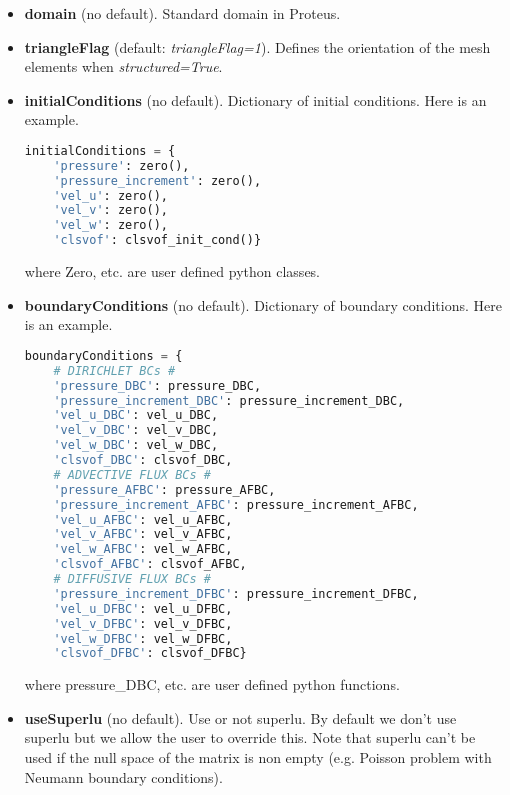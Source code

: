 \documentclass[english,11pt]{article}
\begin{document}
\begin{itemize}
\item {\bf domain} (no default).
  Standard domain in Proteus.

\item {\bf triangleFlag} (default: {\it triangleFlag=1}).
  Defines the orientation of the mesh elements when {\it structured=True}.

\item {\bf initialConditions} (no default).
  Dictionary of initial conditions. Here is an example.

\begin{lstlisting}[language=python, frame=single]
  initialConditions = {
    'pressure': zero(),
    'pressure_increment': zero(),
    'vel_u': zero(),
    'vel_v': zero(),
    'vel_w': zero(),
    'clsvof': clsvof_init_cond()}
\end{lstlisting}  
where Zero, etc. are user defined python classes.

\item {\bf boundaryConditions} (no default).
  Dictionary of boundary conditions. Here is an example.
  
\begin{lstlisting}[language=python, frame=single]
  boundaryConditions = {
    # DIRICHLET BCs #
    'pressure_DBC': pressure_DBC,
    'pressure_increment_DBC': pressure_increment_DBC,
    'vel_u_DBC': vel_u_DBC,
    'vel_v_DBC': vel_v_DBC,
    'vel_w_DBC': vel_w_DBC,
    'clsvof_DBC': clsvof_DBC,
    # ADVECTIVE FLUX BCs #
    'pressure_AFBC': pressure_AFBC,
    'pressure_increment_AFBC': pressure_increment_AFBC,
    'vel_u_AFBC': vel_u_AFBC,
    'vel_v_AFBC': vel_v_AFBC,
    'vel_w_AFBC': vel_w_AFBC,
    'clsvof_AFBC': clsvof_AFBC,
    # DIFFUSIVE FLUX BCs #
    'pressure_increment_DFBC': pressure_increment_DFBC,
    'vel_u_DFBC': vel_u_DFBC,
    'vel_v_DFBC': vel_v_DFBC,
    'vel_w_DFBC': vel_w_DFBC,
    'clsvof_DFBC': clsvof_DFBC}
\end{lstlisting}  
where pressure\_DBC, etc. are user defined python functions.

\item {\bf useSuperlu} (no default).
  Use or not superlu. By default we don't use superlu but we allow the user to override this.  
  Note that superlu can't be used if the null space of the matrix is non empty
  (e.g. Poisson problem with Neumann boundary conditions).
  
\end{itemize}
\end{document}
